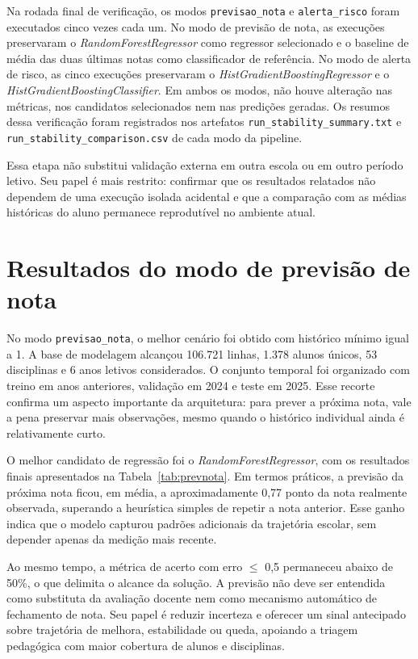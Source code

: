 Na rodada final de verifica\c{c}\~ao, os modos \texttt{previsao\_nota} e \texttt{alerta\_risco} foram executados cinco vezes cada um. No modo de previs\~ao de nota, as execu\c{c}\~oes preservaram o \textit{RandomForestRegressor} como regressor selecionado e o baseline de m\'edia das duas \'ultimas notas como classificador de refer\^encia. No modo de alerta de risco, as cinco execu\c{c}\~oes preservaram o \textit{HistGradientBoostingRegressor} e o \textit{HistGradientBoostingClassifier}. Em ambos os modos, n\~ao houve altera\c{c}\~ao nas m\'etricas, nos candidatos selecionados nem nas predi\c{c}\~oes geradas. Os resumos dessa verifica\c{c}\~ao foram registrados nos artefatos \texttt{run\_stability\_summary.txt} e \texttt{run\_stability\_comparison.csv} de cada modo da pipeline.

Essa etapa n\~ao substitui valida\c{c}\~ao externa em outra escola ou em outro per\'iodo letivo. Seu papel \'e mais restrito: confirmar que os resultados relatados n\~ao dependem de uma execu\c{c}\~ao isolada acidental e que a compara\c{c}\~ao com as m\'edias hist\'oricas do aluno permanece reprodut\'ivel no ambiente atual.

\section{Resultados do modo de previs\~ao de nota}
\label{sec:prev-nota}

No modo \texttt{previsao\_nota}, o melhor cen\'ario foi obtido com hist\'orico m\'inimo igual a 1. A base de modelagem alcan\c{c}ou 106.721 linhas, 1.378 alunos \'unicos, 53 disciplinas e 6 anos letivos considerados. O conjunto temporal foi organizado com treino em anos anteriores, valida\c{c}\~ao em 2024 e teste em 2025. Esse recorte confirma um aspecto importante da arquitetura: para prever a pr\'oxima nota, vale a pena preservar mais observa\c{c}\~oes, mesmo quando o hist\'orico individual ainda \'e relativamente curto.

O melhor candidato de regress\~ao foi o \textit{RandomForestRegressor}, com os resultados finais apresentados na Tabela~\ref{tab:prevnota}. Em termos pr\'aticos, a previs\~ao da pr\'oxima nota ficou, em m\'edia, a aproximadamente 0,77 ponto da nota realmente observada, superando a heur\'istica simples de repetir a nota anterior. Esse ganho indica que o modelo capturou padr\~oes adicionais da trajet\'oria escolar, sem depender apenas da medi\c{c}\~ao mais recente.

Ao mesmo tempo, a m\'etrica de acerto com erro $\leq$ 0,5 permaneceu abaixo de 50\%, o que delimita o alcance da solu\c{c}\~ao. A previs\~ao n\~ao deve ser entendida como substituta da avalia\c{c}\~ao docente nem como mecanismo autom\'atico de fechamento de nota. Seu papel \'e reduzir incerteza e oferecer um sinal antecipado sobre trajet\'oria de melhora, estabilidade ou queda, apoiando a triagem pedag\'ogica com maior cobertura de alunos e disciplinas.

